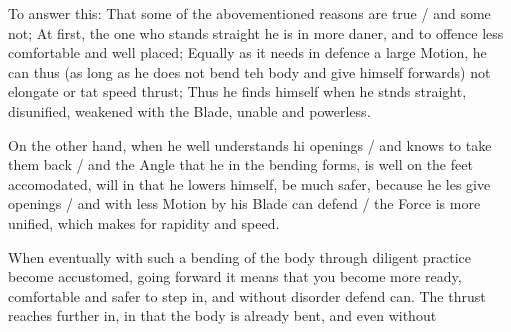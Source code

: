 To answer this: That some of the abovementioned reasons are true / and
some not; At first, the one who stands straight he is in more daner,
and to offence less comfortable and well placed; Equally as it needs
in defence a large Motion, he can thus (as long as he does not
bend teh body and give himself forwards) not elongate or tat speed
thrust; Thus he finds himself when he stnds straight, disunified,
weakened with the Blade, unable and powerless.


On the other hand, when he well understands hi openings / and knows to
take them back / and the Angle that he in the bending forms, is well
on the feet accomodated, will in that he lowers himself, be much safer, because he les give
openings / and with less Motion by his Blade can defend / the Force is
more unified, which makes for rapidity and speed.


When eventually with such a bending of the body through diligent
practice become accustomed, going forward it means that you become
more ready, comfortable and safer to step in, and without disorder
defend can. The thrust reaches further in, in that the body is already
bent, and even without